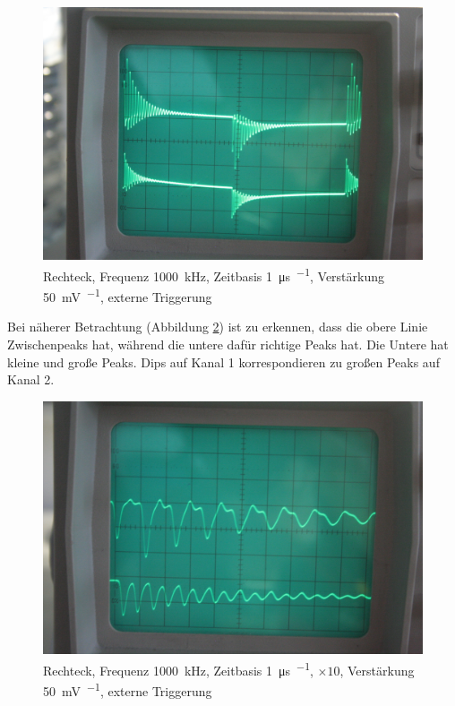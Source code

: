 \begin{figure}
	\centering
	\begin{minipage}{.45\linewidth}
	\end{minipage}
	\hfill
	\begin{minipage}{.45\linewidth}
	\includegraphics[width=\linewidth]{Fotos/IMG_0757-1500.jpg}
	\end{minipage}
	\caption{%
		Rechteck, Frequenz \SI{1000}{\kilo\hertz}, Zeitbasis \SI{1}{\micro\second\per\division}, Verstärkung \SI{50}{\milli\volt\per\division}, externe Triggerung
	}
	\label{fig:0757}
\end{figure}

Bei näherer Betrachtung (Abbildung \ref{fig:0759}) ist zu erkennen, dass die
obere Linie Zwischenpeaks hat, während die untere dafür richtige Peaks hat. Die
Untere hat kleine und große Peaks. Dips auf Kanal 1 korrespondieren zu großen
Peaks auf Kanal 2.

\begin{figure}
	\centering
	\begin{minipage}{.45\linewidth}
	\end{minipage}
	\hfill
	\begin{minipage}{.45\linewidth}
	\includegraphics[width=\linewidth]{Fotos/IMG_0759-1500.jpg}
	\end{minipage}
	\caption{%
		Rechteck, Frequenz \SI{1000}{\kilo\hertz},
		Zeitbasis \SI{1}{\micro\second\per\division},
		$\times 10$,
		Verstärkung \SI{50}{\milli\volt\per\division},
		externe Triggerung
	}
	\label{fig:0759}
\end{figure}

